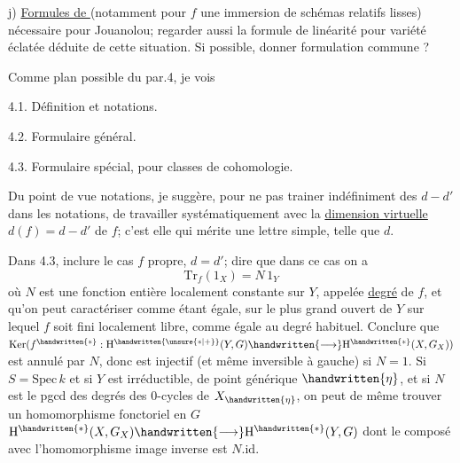  j) \uline{Formules de } (notamment pour $f$ une immersion de schémas relatifs lisses)\handwritten{,} nécessaire pour Jouanolou; regarder aussi la formule de linéarité pour variété éclatée déduite de cette situation. Si possible, donner formulation commune ?

Comme plan possible du par.4, je vois

4.1. Définition et notations.

4.2. Formulaire général.

4.3. Formulaire spécial, pour classes de cohomologie.

Du point de vue notations, je suggère, pour ne pas trainer indéfiniment des $d-d'$ dans les notations, de travailler systématiquement avec la \uline{dimension virtuelle} $d(f)=d-d'$ de $f$; c'est elle qui mérite une lettre simple, telle que $d$.

Dans 4.3, inclure le cas $f$ propre, $d=d'$; dire que dans ce  cas on a
\[
\mathrm{Tr}_f(1_X)=N\,1_Y
\]
où $N$ est une fonction entière localement constante sur $Y$, appelée \uline{degré} de $f$, et qu'on peut caractériser comme étant égale, sur  le plus grand ouvert de $Y$ sur lequel $f$ soit fini localement libre, comme égale au degré habituel. Conclure que $\mathrm{Ker}(f^{\handwritten{*}}:\mathrm{H}^{\handwritten{\unsure{*|+}}}(Y,G)\handwritten{\longrightarrow}\mathrm{H}^{\handwritten{*}}(X,G_X))$ est annulé par $N$, donc est injectif (et même inversible à gauche) si $N=1$. \handwritten{[}Si $S=\mathrm{Spec}\,k$ et si $Y$ est irréductible, de point générique $\handwritten{\eta}$, et si $N$ est le pgcd des degrés des $0$-cycles de $X_{\handwritten{\eta}}$\inserted{\handwritten{$\neq\unsure{\phi|\varnothing}$}}, on peut de même trouver un homomorphisme\handwritten{,} fonctoriel en $G$\handwritten{\unsure{$\leftarrow$}}\handwritten{,} $\mathrm{H}^{\handwritten{*}}(X,G_X)\handwritten{\longrightarrow}\mathrm{H}^{\handwritten{*}}(Y,G)$ dont le composé avec l'homomorphisme image inverse est $N.\mathrm{id}$.\handwritten{]}

